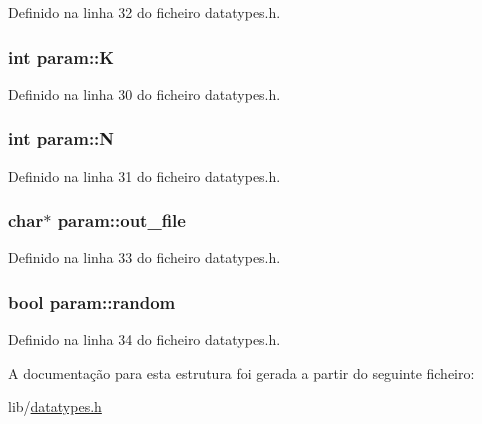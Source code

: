 Definido na linha 32 do ficheiro datatypes.\+h.

\subsubsection[{\texorpdfstring{K}{K}}]{\setlength{\rightskip}{0pt plus 5cm}int param\+::K}\hypertarget{structparam_a145e2314d8aa9d83d73e8e3ef75f22ce}{}\label{structparam_a145e2314d8aa9d83d73e8e3ef75f22ce}


Definido na linha 30 do ficheiro datatypes.\+h.

\subsubsection[{\texorpdfstring{N}{N}}]{\setlength{\rightskip}{0pt plus 5cm}int param\+::N}\hypertarget{structparam_aeaec5e6ee20fdc326936bd7b458c9a6b}{}\label{structparam_aeaec5e6ee20fdc326936bd7b458c9a6b}


Definido na linha 31 do ficheiro datatypes.\+h.

\subsubsection[{\texorpdfstring{out\+\_\+file}{out_file}}]{\setlength{\rightskip}{0pt plus 5cm}char$\ast$ param\+::out\+\_\+file}\hypertarget{structparam_aa3f61385f1113666058489f5f8629e89}{}\label{structparam_aa3f61385f1113666058489f5f8629e89}


Definido na linha 33 do ficheiro datatypes.\+h.

\subsubsection[{\texorpdfstring{random}{random}}]{\setlength{\rightskip}{0pt plus 5cm}bool param\+::random}\hypertarget{structparam_a891751e85aa3c137b33e7bf1e9748230}{}\label{structparam_a891751e85aa3c137b33e7bf1e9748230}


Definido na linha 34 do ficheiro datatypes.\+h.



A documentação para esta estrutura foi gerada a partir do seguinte ficheiro\+:\begin{DoxyCompactItemize}
\item 
lib/\hyperlink{datatypes_8h}{datatypes.\+h}\end{DoxyCompactItemize}
